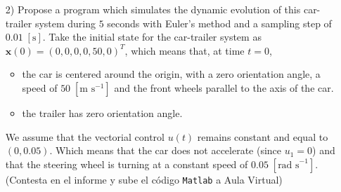 \documentclass{article}
\begin{document}
\begin{itemize}
\item[2)] Propose a program which simulates the dynamic evolution of this car-trailer system during $5$ seconds with
Euler's method and a sampling step of $0.01 \; [\text{s}]$. Take the initial state for the car-trailer system as $\mathbf{x}(0) =
(0, 0, 0, 0, 50, 0)^T$, which means that, at time $t = 0$,

\begin{itemize}

\item
the car is centered around the origin, with a zero orientation angle, a speed of $50 \; [\text{m s}^{-1}]$ and the front wheels parallel to the axis of the car. 

\item
 the trailer has zero orientation angle. 

\end{itemize}

We assume
that the vectorial control $u(t)$ remains constant and equal to $(0, 0.05)$. Which means that the car
does not accelerate (since $u_1 = 0$) and that the steering wheel is turning at a constant speed of
$0.05 \; [\text{rad s}^{-1}]$. (Contesta en el informe y sube el c\'odigo \texttt{Matlab} a Aula Virtual)

\end{itemize}

\newpage
\end{document}
